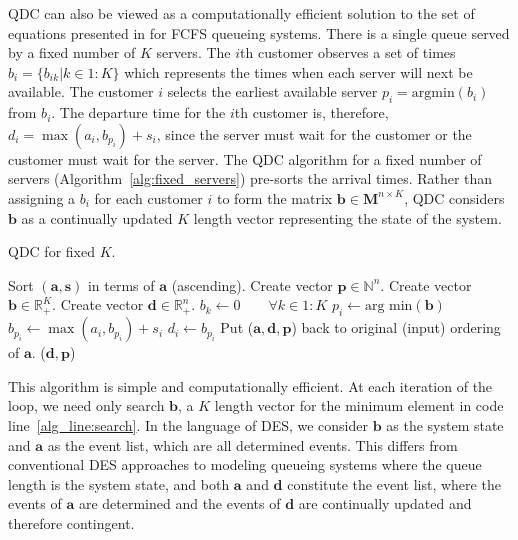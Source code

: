\documentclass[article]{jss}
\begin{document}
QDC can also be viewed as a computationally efficient solution to the
set of equations presented in \citet[p.~259]{sutton_bayesian_2011} for
FCFS queueing systems. There is a single queue served by a fixed
number of $K$ servers. The $i$th customer observes a set of times
$b_i = \{ b_{ik} | k \in 1:K \}$ which represents the times when each
server will next be available. The customer $i$ selects the earliest
available server $p_i = \text{argmin}(b_i)$ from $b_i$. The departure
time for the $i$th customer is, therefore,
$d_i = \max({a_i, b_{p_i}}) + s_i$, since the server must wait for the
customer or the customer must wait for the server. The QDC algorithm
for a fixed number of servers (Algorithm~\ref{alg:fixed_servers})
pre-sorts the arrival times. Rather than assigning a $b_i$ for each
customer $i$ to form the matrix
$\mathbf{b} \in \mathbf{M}^{n \times K}$, QDC considers $\mathbf{b}$
as a continually updated $K$ length vector representing the state of
the system.

\begin{algorithm}[t!]
\caption{QDC for fixed $K$.}
\label{alg:fixed_servers}
\begin{algorithmic}[1]
\State Sort $(\mathbf{a}, \mathbf{s})$ in terms of $\mathbf{a}$ (ascending).
\State Create vector $\mathbf{p} \in \mathbb{N}^{n}$.
\State Create vector $\mathbf{b} \in \mathbb{R}_{+}^{K}$. 
\State Create vector $\mathbf{d} \in \mathbb{R}_{+}^{n}$.
\State $b_k \leftarrow 0 \quad \quad \forall k \in 1:K $
  \State $p_i \leftarrow \text{arg min}(\mathbf{b}) $ \label{alg_line:search}
  \State $b_{p_i} \leftarrow \max(a_i, b_{p_i}) + s_i $
  \State $d_i \leftarrow b_{p_i}$ 
\EndFor 
\State Put ($\mathbf{a}, \mathbf{d}, \mathbf{p}$) back to original (input) ordering of $\mathbf{a}$.
\State \Return ($\mathbf{d}, \mathbf{p}$)
\EndFunction
\end{algorithmic}
\end{algorithm}

This algorithm is simple and computationally efficient. At each iteration of the loop, we need only search $\mathbf{b}$, a $K$ length vector for the minimum element in code line~\ref{alg_line:search}. In the language of DES, we consider $\mathbf{b}$ as the system state and $\mathbf{a}$ as the event list, which are all determined events. This differs from conventional DES approaches to modeling queueing systems where the queue length is the system state, and both $\mathbf{a}$ and $\mathbf{d}$ constitute the event list, where the events of $\mathbf{a}$ are determined and the events of $\mathbf{d}$ are continually updated and therefore contingent.  
\end{document}
